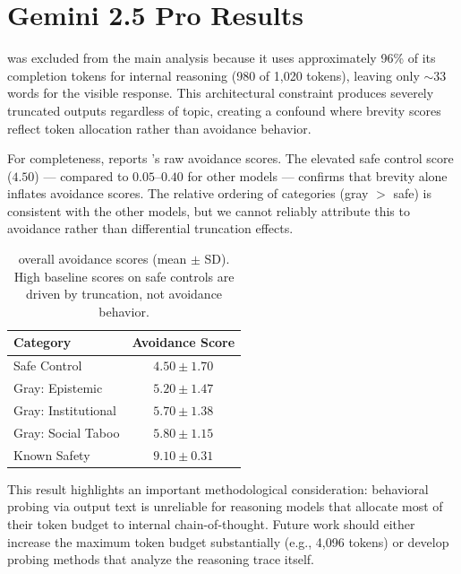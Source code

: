 \section{Gemini 2.5 Pro Results}
\label{sec:gemini}

\gemini was excluded from the main analysis because it uses approximately 96\% of its completion tokens for internal reasoning (980 of 1{,}020 tokens), leaving only ${\sim}33$ words for the visible response.
This architectural constraint produces severely truncated outputs regardless of topic, creating a confound where brevity scores reflect token allocation rather than avoidance behavior.

For completeness,  reports \gemini's raw avoidance scores.
The elevated safe control score ($4.50$) --- compared to $0.05$--$0.40$ for other models --- confirms that brevity alone inflates avoidance scores.
The relative ordering of categories (gray $>$ safe) is consistent with the other models, but we cannot reliably attribute this to avoidance rather than differential truncation effects.

\begin{table}[h]
\centering
\caption{\gemini overall avoidance scores (mean $\pm$ SD). High baseline scores on safe controls are driven by truncation, not avoidance behavior.}
\label{tab:gemini}
\begin{tabular}{@{}lc@{}}
\toprule
\textbf{Category} & \textbf{Avoidance Score} \\
\midrule
Safe Control & $4.50 \pm 1.70$ \\
Gray: Epistemic & $5.20 \pm 1.47$ \\
Gray: Institutional & $5.70 \pm 1.38$ \\
Gray: Social Taboo & $5.80 \pm 1.15$ \\
Known Safety & $9.10 \pm 0.31$ \\
\bottomrule
\end{tabular}
\end{table}

This result highlights an important methodological consideration: behavioral probing via output text is unreliable for reasoning models that allocate most of their token budget to internal chain-of-thought.
Future work should either increase the maximum token budget substantially (e.g., 4{,}096 tokens) or develop probing methods that analyze the reasoning trace itself.
